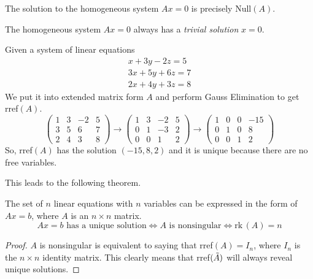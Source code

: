 \documentclass{article}
\begin{document}
    \begin{corollary}
    The solution to the homogeneous system $A x = 0$ is precisely Null$(A)$. 
    \end{corollary}

    \begin{definition}
    The homogeneous system $A x = 0$ always has a \textit{trivial solution} $x = 0$. 
    \end{definition}

    \begin{example}
    Given a system of linear equations 
    \begin{align*}
        x + 3 y - 2z = 5 \\
        3 x + 5 y + 6 z = 7 \\
        2 x + 4 y + 3 z = 8
    \end{align*}
    We put it into extended matrix form $A$ and perform Gauss Elimination to get rref$(A)$. 
    \[\begin{pmatrix}
    1 & 3&-2&5 \\ 3&5&6&7\\ 2&4&3&8
    \end{pmatrix} \rightarrow \begin{pmatrix}
    1&3&-2&5\\ 0&1&-3&2 \\ 0&0&1&2 \end{pmatrix} \rightarrow \begin{pmatrix}
    1&0&0&-15 \\ 0&1&0&8 \\ 0&0&1&2
    \end{pmatrix}\]
    So, rref$(A)$ has the solution $(-15, 8, 2)$ and it is unique because there are no free variables. 
    \end{example}

    This leads to the following theorem. 

    \begin{theorem}
    The set of $n$ linear equations with $n$ variables can be expressed in the form of $A x = b$, where $A$ is an $n \times n$ matrix. 
    \[ A x = b \text{ has a unique solution} \iff A \text{ is nonsingular} \iff \text{rk}\,(A) = n\]
    \end{theorem}
    \begin{proof}
    $A$ is nonsingular is equivalent to saying that rref$(A) = I_n$, where $I_n$ is the $n \times n$ identity matrix. This clearly means that rref$(\Tilde{A})$ will always reveal unique solutions. 
    \end{proof}
\end{document}
